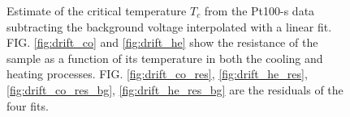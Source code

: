 \documentclass[rmp,10pt,onecolumn,fleqn,notitlepage]{revtex4-1}
\begin{document}
\begin{figure}[h!]
\begin{minipage}[c]{0.49\linewidth}
\end{minipage}
\hfill
\begin{minipage}[]{0.49\linewidth}
\centering
{}
\end{minipage}
\caption{\label{fig:manual_drift} Estimate of the critical temperature $T_c$ from the Pt100-s data subtracting the background voltage interpolated with a linear fit. FIG. \ref{fig:drift_co} and \ref{fig:drift_he} show the resistance of the sample as a function of its temperature in both the cooling and heating processes. FIG. \ref{fig:drift_co_res}, \ref{fig:drift_he_res}, \ref{fig:drift_co_res_bg}, \ref{fig:drift_he_res_bg} are the residuals of the four fits.}
\end{figure}
\end{document}
